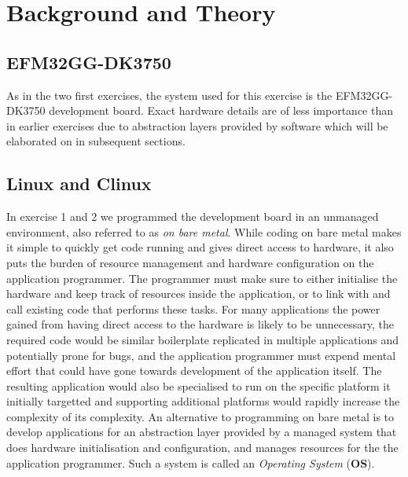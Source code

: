 \chapter{Background and Theory}

\section{EFM32GG-DK3750}

As in the two first exercises, the system used for this exercise is the
EFM32GG-DK3750 development board. Exact hardware details are of less importance
than in earlier exercises due to abstraction layers provided by software which
will be elaborated on in subsequent sections.

\section{Linux and \textmu Clinux}

In exercise 1 and 2 we programmed the development board in an unmanaged
environment, also referred to as \emph{on bare metal}. While coding on bare
metal makes it simple to quickly get code running and gives direct access to
hardware, it also puts the burden of resource management and hardware
configuration on the application programmer. The programmer must make sure to
either initialise the hardware and keep track of resources inside the
application, or to link with and call existing code that performs these tasks.
For many applications the power gained from having direct access to the hardware
is likely to be unnecessary, the required code would be similar boilerplate
replicated in multiple applications and potentially prone for bugs, and the
application programmer must expend mental effort that could have gone towards
development of the application itself. The resulting application would also be
specialised to run on the specific platform it initially targetted and
supporting additional platforms would rapidly increase the complexity of its
complexity. An alternative to programming on bare metal is to develop
applications for an abstraction layer provided by a managed system that does
hardware initialisation and configuration, and manages resources for the the
application programmer. Such a system is called an \emph{Operating System}
(\textbf{OS}).

